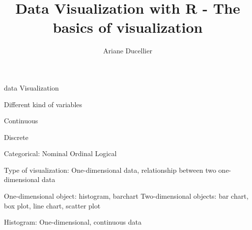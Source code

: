 \documentclass{beamer}
\title[The basics of visualization]{Data Visualization with R - The basics of visualization}
\author{Ariane Ducellier}
\begin{document}
	\begin{frame}
		\titlepage
	\end{frame}

	\begin{frame}


data Visualization

Different kind of variables

Continuous

Discrete

Categorical: Nominal
                    Ordinal
                    Logical
                    
Type of visualization: One-dimensional data, relationship between two one-dimensional data
          
One-dimensional object: histogram, barchart
Two-dimensional objects: bar chart, box plot, line chart, scatter plot

Histogram: One-dimensional, continuous data

	\end{frame}
\end{document}
